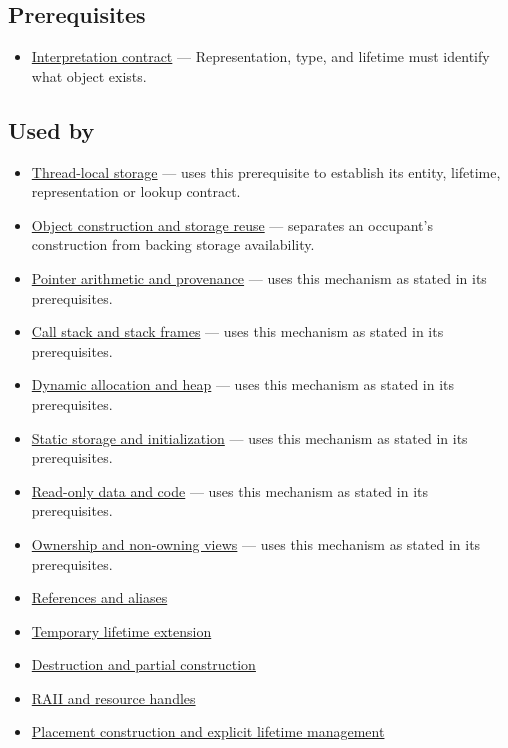 \subsection{Prerequisites}\label{appendix-0b104bcba06b-prerequisites}

\hypertarget{appendix-0b104bcba06b-prerequisites}{}

\begin{itemize}
\tightlist
\item
  \hyperref[appendix-f414bd4ed05c]{Interpretation contract} --- Representation, type, and lifetime must identify what object exists.
\end{itemize}

\subsection{Used by}\label{appendix-0b104bcba06b-used-by}

\hypertarget{appendix-0b104bcba06b-used-by}{}

\begin{itemize}
\tightlist
\item
  \hyperref[appendix-3b88c6cd7195]{Thread-local storage} --- uses this prerequisite to establish its entity, lifetime, representation or lookup contract.
\item
  \hyperref[appendix-a82f9c438857]{Object construction and storage reuse} --- separates an occupant's construction from backing storage availability.
\item
  \hyperref[appendix-6af5921bc853]{Pointer arithmetic and provenance} --- uses this mechanism as stated in its prerequisites.
\item
  \hyperref[appendix-b081b7abe193]{Call stack and stack frames} --- uses this mechanism as stated in its prerequisites.
\item
  \hyperref[appendix-c3480f7d9ff3]{Dynamic allocation and heap} --- uses this mechanism as stated in its prerequisites.
\item
  \hyperref[appendix-17c93c4c2f19]{Static storage and initialization} --- uses this mechanism as stated in its prerequisites.
\item
  \hyperref[appendix-5f9e5e2f0a5e]{Read-only data and code} --- uses this mechanism as stated in its prerequisites.
\item
  \hyperref[appendix-d52e4486f527]{Ownership and non-owning views} --- uses this mechanism as stated in its prerequisites.
\item
  \hyperref[appendix-d6d562ca9fbb]{References and aliases}
\item
  \hyperref[appendix-a978b29bbbb0]{Temporary lifetime extension}
\item
  \hyperref[appendix-9bfe377cef7a]{Destruction and partial construction}
\item
  \hyperref[appendix-69739d3ab49b]{RAII and resource handles}
\item
  \hyperref[appendix-f56c3e43fd4e]{Placement construction and explicit lifetime management}
\end{itemize}


